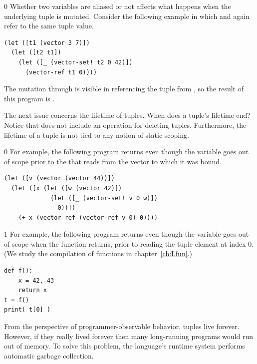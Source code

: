 \documentclass[7x10]{TimesAPriori_MIT}%
\def\racketEd{0}
\def\pythonEd{1}
\def\edition{1}
\newcommand{\pythonColor}[0]{}
\numberwithin{theorem}{chapter}
\numberwithin{definition}{chapter}
\numberwithin{equation}{chapter}
\begin{document}
{\if\edition\racketEd        
Whether two variables are aliased or not affects what happens
when the underlying tuple is mutated.
Consider the following example in which  and 
again refer to the same tuple value.
\begin{center}
\begin{minipage}{0.96\textwidth}
\begin{lstlisting}
(let ([t1 (vector 3 7)])
  (let ([t2 t1])
    (let ([_ (vector-set! t2 0 42)])
      (vector-ref t1 0))))
\end{lstlisting}
\end{minipage}
\end{center}
The mutation through  is visible in referencing the tuple
from , so the result of this program is .
\fi}

The next issue concerns the lifetime of tuples. When does a tuple's
lifetime end?  Notice that \LangVec{} does not include an operation
for deleting tuples. Furthermore, the lifetime of a tuple is not tied
to any notion of static scoping.
%
{\if\edition\racketEd        
%
For example, the following program returns  even though the
variable  goes out of scope prior to the 
that reads from the vector to which it was bound.
\begin{center}
\begin{minipage}{0.96\textwidth}
\begin{lstlisting}
(let ([v (vector (vector 44))])
  (let ([x (let ([w (vector 42)])
             (let ([_ (vector-set! v 0 w)])
               0))])
    (+ x (vector-ref (vector-ref v 0) 0))))
\end{lstlisting}
\end{minipage}
\end{center}
\fi}
%
{\if\edition\pythonEd\pythonColor
%
For example, the following program returns  even though the
variable  goes out of scope when the function returns, prior
to reading the tuple element at index $0$. (We study the compilation
of functions in chapter~\ref{ch:Lfun}.)
%  
\begin{center}
\begin{minipage}{0.96\textwidth}
\begin{lstlisting}
def f():
    x = 42, 43
    return x
t = f()
print( t[0] )
\end{lstlisting}
\end{minipage}
\end{center}
\fi}
%
From the perspective of programmer-observable behavior, tuples live
forever. However, if they really lived forever then many long-running
programs would run out of memory. To solve this problem, the
language's runtime system performs automatic garbage collection.
\end{document}
